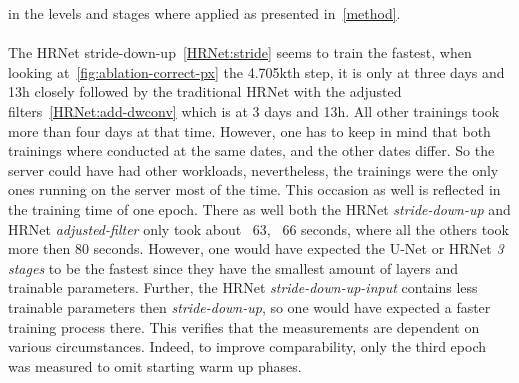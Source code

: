 in the levels and stages where applied as presented in~\autoref{method}.
\\\mbox{}\\
The HRNet stride-down-up~\ref{HRNet:stride} seems to train the fastest, when looking at~\ref{fig:ablation-correct-px} the
4.705kth step, it is only at three days and 13h closely followed by the traditional HRNet with the adjusted filters~\ref{HRNet:add-dwconv}
which is at 3 days and 13h. All other trainings took more than four days at that time.
However, one has to keep in mind that both trainings where conducted at the same dates, and the other dates differ.
So the server could have had other workloads, nevertheless, the trainings were the only ones running on the server most
of the time. This occasion as well is reflected in the training time of one epoch.
There as well both the HRNet \textit{stride-down-up} and HRNet \textit{adjusted-filter} only took about ~63, ~66 seconds,
where all the others took more then 80 seconds.
However, one would have expected the U-Net or HRNet \textit{3 stages} to be the fastest since they have the smallest
amount of layers and trainable parameters.
Further, the HRNet \textit{stride-down-up-input} contains less trainable parameters then \textit{stride-down-up}, so
one would have expected a faster training process there.
This verifies that the measurements are dependent on various circumstances.
Indeed, to improve comparability, only the third epoch was measured to omit starting warm up phases.


